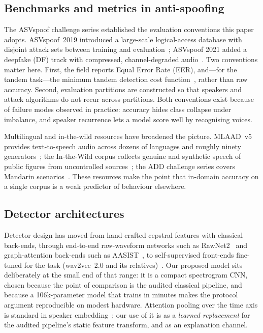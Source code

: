 \documentclass[sn-mathphys-num,pdflatex]{sn-jnl}
\begin{document}
\subsection{Benchmarks and metrics in anti-spoofing}
The ASVspoof challenge series established the evaluation conventions this paper
adopts. ASVspoof~2019 introduced a large-scale logical-access database with
disjoint attack sets between training and evaluation~\cite{asvspoof19}; ASVspoof
2021 added a deepfake (DF) track with compressed, channel-degraded
audio~\cite{asvspoof21,asvspoof21journal}. Two conventions matter here. First,
the field reports Equal Error Rate (EER), and---for the tandem
task---the minimum tandem detection cost function~\cite{tdcf}, rather than raw
accuracy. Second, evaluation partitions are constructed so that speakers and
attack algorithms do not recur across partitions. Both conventions exist because
of failure modes observed in practice: accuracy hides class collapse under
imbalance, and speaker recurrence lets a model score well by recognising
voices.

Multilingual and in-the-wild resources have broadened the picture. MLAAD~v5
provides text-to-speech audio across dozens of languages and roughly ninety
generators~\cite{mlaad}; the In-the-Wild corpus collects genuine and
synthetic speech of public figures from uncontrolled
sources~\cite{itw}; the ADD challenge series covers Mandarin
scenarios~\cite{add2022}. These resources make the point that in-domain accuracy
on a single corpus is a weak predictor of behaviour elsewhere.

\subsection{Detector architectures}
Detector design has moved from hand-crafted cepstral features with classical
back-ends, through end-to-end raw-waveform networks such as
RawNet2~\cite{rawnet2} and graph-attention back-ends such as
AASIST~\cite{aasist}, to self-supervised front-ends fine-tuned for the task
(wav2vec~2.0 and its relatives)~\cite{wav2vec2,wav2vec2aug}. Our proposed model
sits deliberately at the small end of that range: it is a compact spectrogram
CNN, chosen because the point of comparison is the audited classical pipeline,
and because a 106k-parameter model that trains in minutes makes the
protocol argument reproducible on modest hardware. Attention pooling over the
time axis is standard in speaker embedding~\cite{attnpool}; our use of it is
as a \emph{learned replacement} for the audited pipeline's static feature
transform, and as an explanation channel.
\end{document}

